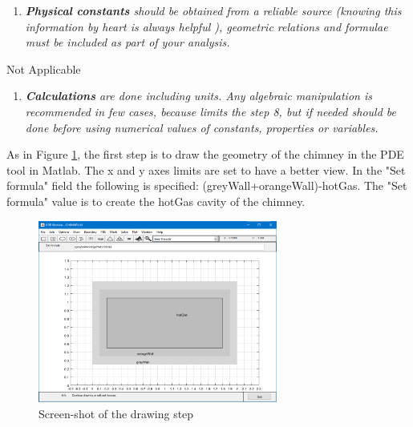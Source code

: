 \documentclass{article}
\begin{document}
\begin{enumerate}[resume]
\item \textit{\textbf{Physical constants} should be obtained from a reliable source (knowing this information by heart is always helpful ), geometric relations and formulae must be included as part of your analysis.}
\end{enumerate}

Not Applicable


\begin{enumerate}[resume]
\item \textit{\textbf{Calculations} are done including units. Any algebraic manipulation is recommended in few cases, because limits the step 8, but if needed should be done before using numerical values of constants, properties or variables.}
\end{enumerate}


As in Figure \ref{fig_drawing}, the first step is to draw the geometry of the chimney in the PDE tool in Matlab. The x and y axes limits are set to have a better view. In the "Set formula" field the following is specified: (greyWall+orangeWall)-hotGas. The "Set formula" value is to create the hotGas cavity of the chimney.

\begin{figure}[h!]
\centering
\includegraphics[width=0.70\textwidth]{./img/0_drawing.png}
\caption{Screen-shot of the drawing step}
\label{fig_drawing}
\end{figure}
\end{document}
